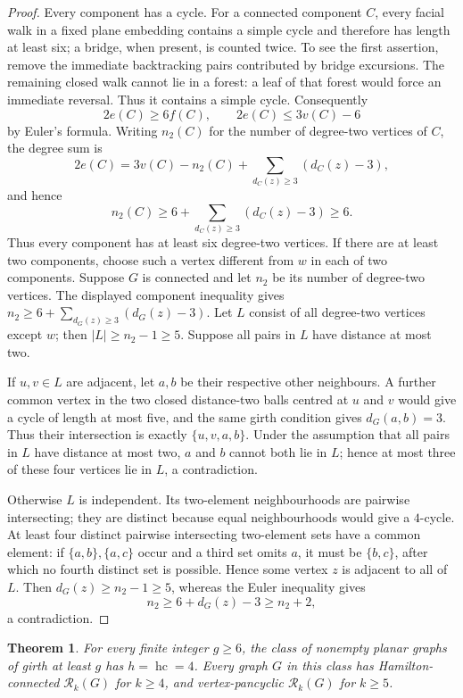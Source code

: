 \documentclass[11pt]{article}
\newtheorem{theorem}{Theorem}[section]
\theoremstyle{remark}
\newcommand{\Rk}{\mathcal R_k}
\newcommand{\hc}{\operatorname{hc}}
\numberwithin{equation}{section}
\numberwithin{table}{section}
\begin{document}
\begin{proof}
Every component has a cycle.  For a connected component $C$, every
facial walk in a fixed plane embedding contains a simple cycle and
therefore has length at least six; a bridge, when present, is counted
twice.  To see the first assertion, remove the immediate backtracking
pairs contributed by bridge excursions.  The remaining closed walk cannot
lie in a forest: a leaf of that forest would force an immediate reversal.
Thus it contains a simple cycle.  Consequently
\[
  2e(C)\ge6f(C),\qquad 2e(C)\le3v(C)-6
\]
by Euler's formula.  Writing $n_2(C)$ for the number of degree-two
vertices of $C$, the degree sum is
\[
  2e(C)=3v(C)-n_2(C)
       +\sum_{d_C(z)\ge3}(d_C(z)-3),
\]
and hence
\[
 n_2(C)\ge6+\sum_{d_C(z)\ge3}(d_C(z)-3)\ge6.
\]
Thus every component has at least six degree-two vertices.  If there are
at least two components, choose such a vertex different from $w$ in each
of two components.  Suppose $G$ is connected and let $n_2$ be its number
of degree-two vertices.  The displayed component inequality gives
$n_2\ge6+\sum_{d_G(z)\ge3}(d_G(z)-3)$.
Let $L$ consist of all degree-two vertices except $w$; then
$|L|\ge n_2-1\ge5$.  Suppose all pairs in $L$ have distance at
most two.

If $u,v\in L$ are adjacent, let $a,b$ be their respective other
neighbours.  A further common vertex in the two closed distance-two
balls centred at $u$ and $v$ would give a cycle of length at most five, and the same girth
condition gives $d_G(a,b)=3$.  Thus their intersection is exactly
$\{u,v,a,b\}$.  Under the assumption that all pairs in $L$ have
distance at most two, $a$ and $b$ cannot both lie in $L$; hence at most
three of these four vertices lie in $L$, a contradiction.

Otherwise $L$ is independent.  Its two-element neighbourhoods are
pairwise intersecting; they are distinct because equal neighbourhoods
would give a $4$-cycle.
At least four distinct pairwise intersecting two-element sets have a
common element: if $\{a,b\},\{a,c\}$ occur and a third set omits
$a$, it must be $\{b,c\}$, after which no fourth distinct set is
possible.  Hence some vertex $z$ is adjacent to all of $L$.
Then $d_G(z)\ge n_2-1\ge5$, whereas the Euler inequality gives
\[
 n_2\ge6+d_G(z)-3\ge n_2+2,
\]
a contradiction.
\end{proof}

\begin{theorem}
\label{thm:girth6-hc}
For every finite integer $g\ge6$, the class of nonempty planar graphs
of girth at least $g$ has $h=\hc=4$.  Every graph $G$ in this
class has Hamilton-connected $\Rk(G)$ for $k\ge4$, and
vertex-pancyclic $\Rk(G)$ for $k\ge5$.
\end{theorem}
\end{document}
